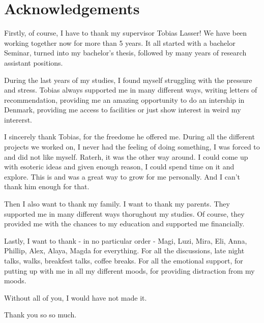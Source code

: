 \thispagestyle{empty}
\chapter*{Acknowledgements}

\noindent
%

Firstly, of course, I have to thank my supervisor Tobias Lasser! We have been working together now
for more than 5 years. It all started with a bachelor Seminar, turned into my bachelor's thesis,
followed by many years of research assistant positions.

During the last years of my studies, I found myself struggling with the pressure and stress.
Tobias always supported me in many different ways, writing letters of recommendation, providing me
an amazing opportunity to do an intership in Denmark, providing me access to facilities or just
show interest in weird my intererst.

I sincerely thank Tobias, for the freedome he offered me. During all the different projects we worked on,
I never had the feeling of doing something, I was forced to and did not like myself.
Raterh, it was the other way around. I could come up with esoteric ideas and given enough reason,
I could spend time on it and explore. This is and was a great way to grow for me personally. And
I can't thank him enough for that.

Then I also want to thank my family. I want to thank my parents. They supported me in many different
ways thorughout my studies. Of course, they provided me with the chances to my education and
supported me financially.

Lastly, I want to thank - in no particular order - Magi, Luzi, Mira, Eli, Anna, Phillip, Alex, Alaya,
Magda for everything. For all the discussions, late night talks, walks, breakfest talks, coffee breaks.
For all the emotional support, for putting up with me in all my different moods, for providing
distraction from my moods.

Without all of you, I would have not made it.

\begin{flushleft}
	Thank you so so much.
\end{flushleft}
